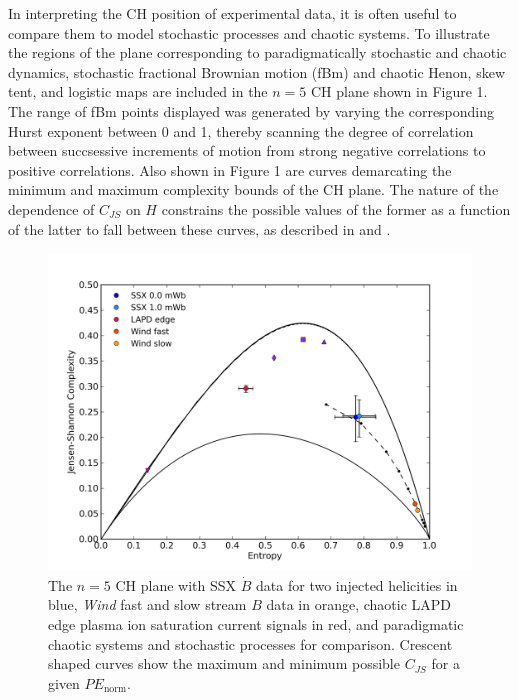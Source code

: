 \documentclass[aps,twocolumn,secnumarabic,nobalancelastpage,amsmath,amssymb,
nofootinbib]{revtex4-1}
\begin{document}
In interpreting the CH position of experimental data, it is often useful to compare them to model  stochastic processes and chaotic systems. To illustrate the regions of the plane corresponding to paradigmatically stochastic and chaotic dynamics, stochastic fractional Brownian motion (fBm) and chaotic Henon, skew tent, and logistic maps are included in the $n=5$ CH plane shown in Figure 1. The range of fBm points displayed was generated by varying the corresponding Hurst exponent between 0 and 1, thereby scanning the degree of correlation between succsessive increments of motion from strong negative correlations to positive correlations. Also shown in Figure 1 are curves demarcating the minimum and maximum complexity bounds of the CH plane. The nature of the dependence of $C_{JS}$ on $H$ constrains the possible values of the former as a function of the latter to fall between these curves, as described in \cite{lopez1995} and \cite{calbet2001}.
\begin{figure}[!htbp]
\centerline{
\includegraphics[width=17cm]{fig1.png}}
\caption{\label{Figure 1} The $n=5$ CH plane  with SSX $\dot{B}$ data for two injected helicities in blue, \textit{Wind} fast and slow stream $B$ data in orange, chaotic LAPD edge plasma ion saturation current signals in red, and paradigmatic chaotic systems and stochastic processes for comparison. Crescent shaped curves show the maximum and minimum possible $C_{JS}$ for a given $PE_{\text{norm}}$.}
\end{figure}
\end{document}
